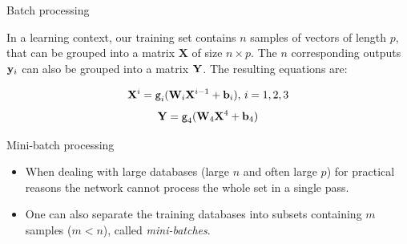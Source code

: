 \documentclass[xcolor=pdftex,dvipsnames,table,mathserif]{beamer}
\begin{document}

\begin{frame}{Batch processing}

  In a learning context, our training set contains $n$ samples of vectors of length $p$, that can be grouped into a matrix $\mathbf{X}$ of size $n \times p$. The $n$ corresponding outputs $\mathbf{y}_i$ can also be grouped into a matrix $\mathbf{Y}$. The resulting equations are:

  \begin{block}{}
    \[\mathbf{X}^i = \texttt{g}_i(\mathbf{W}_i\mathbf{X}^{i-1} + \mathbf{b}_i),\, i= 1, 2, 3 \]
    \[\mathbf{Y} = \texttt{g}_4(\mathbf{W}_4\mathbf{X}^4 + \mathbf{b}_4)\]
  \end{block}


\end{frame}

\begin{frame}{Mini-batch processing}

  \begin{itemize}[<+->]
  \item   When dealing with large databases (large $n$ and often large $p$) for practical reasons the network cannot process the whole set in a single pass.
  \item   One can also separate the training databases into subsets containing $m$ samples ($m < n$), called \emph{mini-batches}.
  \end{itemize}

\end{frame}
\end{document}
